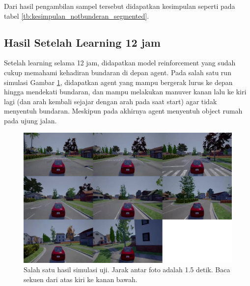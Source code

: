 Dari hasil pengambilan sampel tersebut didapatkan kesimpulan seperti pada tabel \ref{tb:kesimpulan_notbunderan_segmented}.

\begin{table}[H]
	\caption{Kesimpulan Hasil Model DQN pada Bundaran Tanpa Simpang dengan Segmentasi Lanjutan.}
	\label{tb:kesimpulan_notbunderan_segmented}
\end{table}


\iffalse
\subsection{Hasil Setelah Learning 12 jam}
\label{sec:hasil_learning_12}
Setelah learning selama 12 jam, didapatkan model reinforcement yang sudah cukup memahami kehadiran bundaran di depan agent. Pada salah satu run simulasi Gambar \ref{fig:uji0}, didapatkan agent yang mampu bergerak lurus ke depan hingga mendekati bundaran, dan mampu melakukan manuver kanan lalu ke kiri lagi (dan arah kembali sejajar dengan arah pada saat start) agar tidak menyentuh bundaran. Meskipun pada akhirnya agent menyentuh object rumah pada ujung jalan.

\begin{figure}[H] 
	\centering
	\includegraphics[width=1\linewidth]{images/uji0}
	\caption{Salah satu hasil simulasi uji. Jarak antar foto adalah 1.5 detik. Baca sekuen dari atas kiri ke kanan bawah.}
	\label{fig:uji0}
\end{figure}

